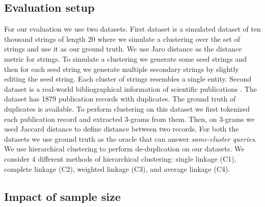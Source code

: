 \subsection{Evaluation setup}
For our evaluation we use two datasets.
First dataset is a simulated dataset of ten thousand strings of length 20 where we simulate a clustering over the set of strings and use it as our ground truth.
We use Jaro distance \cite{jaro1980unimatch} as the distance metric for strings.
To simulate a clustering we generate some seed strings and then for each seed string we generate multiple secondary strings by slightly editing the seed string.
Each cluster of strings resembles a single entity.
Second dataset is a real-world bibliographical information of scientific publications \cite{pubdata}.
The dataset has 1879 publication records with duplicates.
The ground truth of duplicates is available.
To perform clustering on this dataset we first tokenized each publication record and extracted 3-grams from them.
Then, on 3-grams we used Jaccard distance to define distance between two records.
For both the datasets we use ground truth as the oracle that can answer \textit{same-cluster queries}.
We use hierarchical clustering to perform de-duplication on our datasets.
We consider 4 different methods of hierarchical clustering: single linkage (C1), complete linkage (C2), weighted linkage (C3), and average linkage (C4).

\subsection{Impact of sample size}
\label{sec:exp1}

